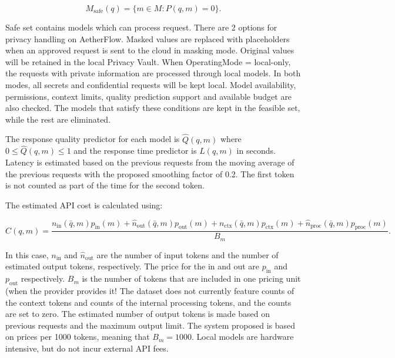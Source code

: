 \documentclass{FastFyp}
\begin{document}
\begin{equation}
M_{\text{safe}}(q) = \{m \in M : P(q,m) = 0\}.
\label{eq:privacy-safe}
\end{equation}

Safe set contains models which can process request. There are 2 options for privacy handling on AetherFlow. Masked values are replaced with placeholders when an approved request is sent to the cloud in masking mode. Original values will be retained in the local Privacy Vault. When OperatingMode = local-only, the requests with private information are processed through local models. In both modes, all secrets and confidential requests will be kept local.
Model availability, permissions, context limits, quality prediction support and available budget are also checked. The models that satisfy these conditions are kept in the feasible set, while the rest are eliminated.

The response quality predictor for each model is $\hat{Q}(q,m)$ where $0 \leq \hat{Q}(q,m) \leq 1$ and the response time predictor is $L(q,m)$ in seconds. Latency is estimated based on the previous requests from the moving average of the previous requests with the proposed smoothing factor of 0.2. The first token is not counted as part of the time for the second token.

The estimated API cost is calculated using:

\begin{equation}
C(q,m) =
\frac{
n_{\text{in}}(\bar{q},m)p_{\text{in}}(m)
+
\hat{n}_{\text{out}}(\bar{q},m)p_{\text{out}}(m)
+
n_{\text{ctx}}(\bar{q},m)p_{\text{ctx}}(m)
+
\hat{n}_{\text{proc}}(\bar{q},m)p_{\text{proc}}(m)
}{B_m}.
\label{eq:token-cost}
\end{equation}

In this case, $n_{\text{in}}$ and $\hat{n}_{\text{out}}$ are the number of input tokens and the number of estimated output tokens, respectively. The price for the in and out are $p_{\text{in}}$ and $p_{\text{out}}$ respectively. $B_m$ is the number of tokens that are included in one pricing unit (when the provider provides it!
The dataset does not currently feature counts of the context tokens and counts of the internal processing tokens, and the counts are set to zero. The estimated number of output tokens is made based on previous requests and the maximum output limit. The system proposed is based on prices per 1000 tokens, meaning that $B_m = 1000$. Local models are hardware intensive, but do not incur external API fees.
\end{document}
